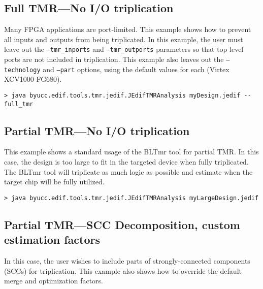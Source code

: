 \subsection{Full TMR---No I/O triplication}
Many FPGA applications are port-limited. This example shows how to prevent all 
inputs and outputs from being triplicated. In this example, the user must leave 
out the \texttt{--tmr\_inports} and \texttt{--tmr\_outports} parameters so that 
top level ports are not included in triplication. This example also leaves out 
the \texttt{--technology} and \texttt{--part} options, using the default values 
for each (Virtex XCV1000-FG680).

\begin{verbatim}
> java byucc.edif.tools.tmr.jedif.JEdifTMRAnalysis myDesign.jedif --full_tmr
\end{verbatim}


\subsection{Partial TMR---No I/O triplication}
This example shows a standard usage of the BLTmr tool for partial TMR\@. In this 
case, the design is too large to fit in the targeted device when fully 
triplicated. The BLTmr tool will triplicate as much logic as possible and 
estimate when the target chip will be fully utilized.


\begin{verbatim}
> java byucc.edif.tools.tmr.jedif.JEdifTMRAnalysis myLargeDesign.jedif 
\end{verbatim}


\subsection{Partial TMR---SCC Decomposition, custom estimation factors}
In this case, the user wishes to include parts of strongly-connected components 
(SCCs) for triplication. This example also shows how to override the default
merge and optimization factors.

